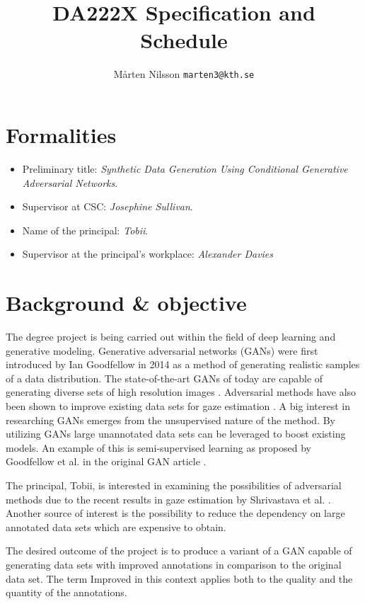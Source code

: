 \documentclass[a4paper]{article}
\title{DA222X Specification and Schedule}
\author{Mårten Nilsson \texttt{marten3@kth.se}}
\begin{document}
\maketitle

\section{Formalities}
\begin{itemize}
\item Preliminary title: \textit{Synthetic Data Generation Using Conditional Generative Adversarial Networks}.
\item Supervisor at CSC: \textit{Josephine Sullivan}.
\item Name of the principal: \textit{Tobii}.
\item Supervisor at the principal's workplace: \textit{Alexander Davies}
\end{itemize}

\section{Background \& objective}
The degree project is being carried out within the field of deep learning and
generative modeling. Generative adversarial networks (GANs) were first introduced by Ian
Goodfellow in 2014 \cite{goodfellow2014generative} as a method of generating realistic samples of a data distribution. The state-of-the-art GANs of today are capable of generating diverse sets of high resolution images \cite{karras2017progressive}. Adversarial methods have also been shown to improve existing data sets for gaze estimation \cite{shrivastava2016learning}. A big interest in researching GANs emerges from the unsupervised nature of the method. By utilizing GANs large unannotated data sets can be leveraged to boost existing models. An example of this is semi-supervised learning as proposed by Goodfellow et al. in the original GAN article \cite{goodfellow2014generative}.

The principal, Tobii, is interested in examining the
possibilities of adversarial methods due to the recent results in gaze estimation by Shrivastava et al. \cite{shrivastava2016learning}. Another source of interest is the possibility to reduce the dependency on large annotated data sets which are expensive to obtain.

The desired outcome of the project is to produce a variant of a GAN capable of
generating data sets with improved annotations in comparison to the original data
set. The term Improved in this context applies
both to the quality and the quantity of the annotations.
\end{document}
